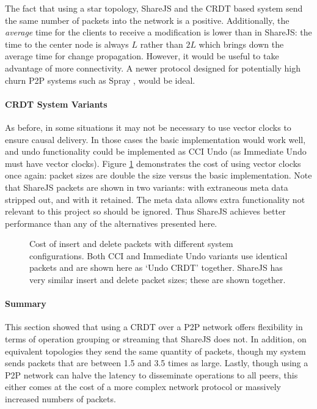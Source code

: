 \documentclass[12pt,a4paper,twoside,openright]{report}
\begin{document}
			The fact that using a star topology, ShareJS and the CRDT based system send the same number of packets into the network is a positive. Additionally, the \textit{average} time for the clients to receive a modification is lower than in ShareJS: the time to the center node is always $L$ rather than $2L$ which brings down the average time for change propagation. However, it would be useful to take advantage of more connectivity. A newer protocol designed for potentially high churn P2P systems such as Spray \cite{nedelec2015spray}, would be ideal.
			
			
		\paragraph{CRDT System Variants}
			As before, in some situations it may not be necessary to use vector clocks to ensure causal delivery. In those cases the basic implementation would work well, and undo functionality could be implemented as CCI Undo (as Immediate Undo must have vector clocks). Figure \ref{fig:sysvariationspackets} demonstrates the cost of using vector clocks once again: packet sizes are double the size versus the basic implementation. Note that ShareJS packets are shown in two variants: with extraneous meta data stripped out, and with it retained. The meta data allows extra functionality not relevant to this project so should be ignored. Thus ShareJS achieves better performance than any of the alternatives presented here.
		
			\begin{figure}[htb]
				\centering
				
				\caption[Behavior of System Variants - Packet Size] {Cost of insert and delete packets with different system configurations. Both CCI and Immediate Undo variants use identical packets and are shown here as `Undo CRDT' together. ShareJS has very similar insert and delete packet sizes; these are shown together.}
				\label{fig:sysvariationspackets}
			\end{figure}
			
		
		\paragraph{Summary}
			This section showed that using a CRDT over a P2P network offers flexibility in terms of operation grouping or streaming that ShareJS does not. In addition, on equivalent topologies they send the same quantity of packets, though my system sends packets that are between 1.5 and 3.5 times as large. Lastly, though using a P2P network can halve the latency to disseminate operations to all peers, this either comes at the cost of a more complex network protocol or massively increased numbers of packets.
			
\end{document}
